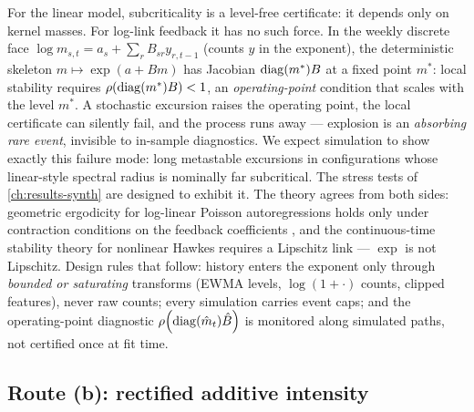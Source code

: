 \begin{warning}\label{warn:ch05:mechB}
For the linear model, subcriticality is a level-free certificate: it
depends only on kernel masses. For log-link feedback it has no such
force. In the weekly discrete face $\log m_{s,t} = a_s + \sum_r B_{sr}
y_{r,t-1}$ (counts $y$ in the exponent), the deterministic skeleton $m
\mapsto \exp(a + Bm)$ has Jacobian $\operatorname{diag}(m^*)B$ at a fixed point $m^*$:
local stability requires $\rho\!\left(\operatorname{diag}(m^*)B\right) < 1$, an
\emph{operating-point} condition that scales with the level $m^*$. A
stochastic excursion raises the operating point, the local certificate
can silently fail, and the process runs away --- explosion is an
\emph{absorbing rare event}, invisible to in-sample diagnostics. We
expect simulation to show exactly this failure mode: long metastable
excursions in configurations whose linear-style spectral radius is
nominally far subcritical. The stress tests of \cref{ch:results-synth}
are designed to exhibit it. The theory
agrees from both sides: geometric ergodicity for log-linear Poisson
autoregressions holds only under contraction conditions on the feedback
coefficients \citep{fokianos2011}, and the continuous-time stability
theory for nonlinear Hawkes requires a Lipschitz link
\citep{bremaud1996} --- $\exp$ is not Lipschitz. Design rules that
follow: history enters the exponent only through \emph{bounded or
saturating} transforms (EWMA levels, $\log(1+\cdot)$ counts, clipped
features), never raw counts; every simulation carries event caps; and the
operating-point diagnostic $\rho\!\left(\operatorname{diag}(\hat m_t)\hat B\right)$ is monitored
along simulated paths, not certified once at fit time.
\end{warning}

\subsection*{Route (b): rectified additive intensity}

